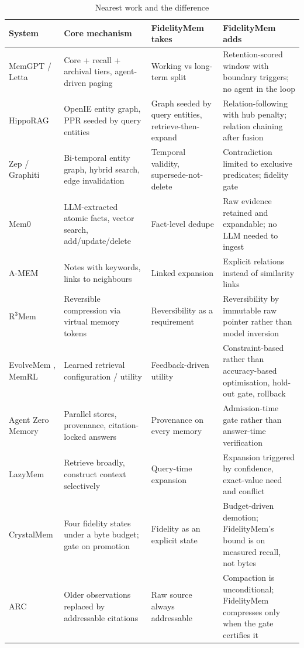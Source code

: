 \documentclass[journal]{IEEEtran}
\begin{document}
\begin{table}[t]
\caption{Nearest work and the difference}
\label{tab:related}
\centering
\footnotesize
\begin{tabular}{p{3.0cm}p{4.3cm}p{3.6cm}p{5.8cm}}
\toprule
System & Core mechanism & FidelityMem takes & FidelityMem adds \\
\midrule
MemGPT / Letta \cite{memgpt} & Core + recall + archival tiers, agent-driven paging & Working vs long-term split & Retention-scored window with boundary triggers; no agent in the loop \\
HippoRAG \cite{hipporag} & OpenIE entity graph, PPR seeded by query entities & Graph seeded by query entities, retrieve-then-expand & Relation-following with hub penalty; relation chaining after fusion \\
Zep / Graphiti \cite{zep} & Bi-temporal entity graph, hybrid search, edge invalidation & Temporal validity, supersede-not-delete & Contradiction limited to exclusive predicates; fidelity gate \\
Mem0 \cite{mem0} & LLM-extracted atomic facts, vector search, add/update/delete & Fact-level dedupe & Raw evidence retained and expandable; no LLM needed to ingest \\
A-MEM \cite{amem} & Notes with keywords, links to neighbours & Linked expansion & Explicit relations instead of similarity links \\
R$^3$Mem \cite{r3mem} & Reversible compression via virtual memory tokens & Reversibility as a requirement & Reversibility by immutable raw pointer rather than model inversion \\
EvolveMem \cite{evolvemem}, MemRL \cite{memrl} & Learned retrieval configuration / utility & Feedback-driven utility & Constraint-based rather than accuracy-based optimisation, hold-out gate, rollback \\
Agent Zero Memory \cite{agentzero} & Parallel stores, provenance, citation-locked answers & Provenance on every memory & Admission-time gate rather than answer-time verification \\
LazyMem \cite{lazymem} & Retrieve broadly, construct context selectively & Query-time expansion & Expansion triggered by confidence, exact-value need and conflict \\
CrystalMem \cite{crystalmem} & Four fidelity states under a byte budget; gate on promotion & Fidelity as an explicit state & Budget-driven demotion; FidelityMem's bound is on measured recall, not bytes \\
ARC \cite{arc} & Older observations replaced by addressable citations & Raw source always addressable & Compaction is unconditional; FidelityMem compresses only when the gate certifies it \\

\end{tabular}
\end{table}
\end{document}
